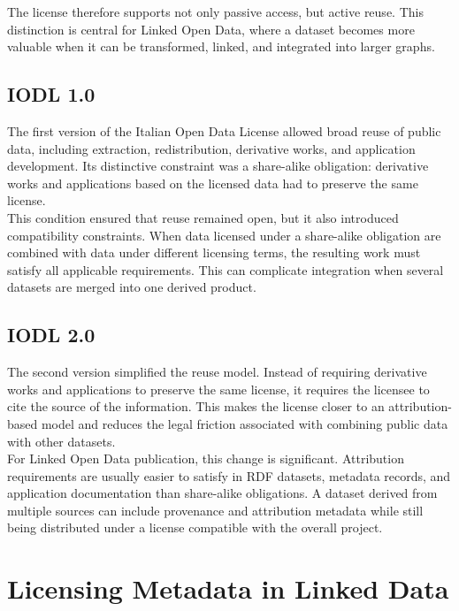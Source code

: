 \documentclass{scrbook}
\begin{document}
	The license therefore supports not only passive access, but active reuse. This distinction is central for Linked Open Data, where a dataset becomes more valuable when it can be transformed, linked, and integrated into larger graphs.
	
	\subsection{IODL 1.0}
	
	The first version of the Italian Open Data License allowed broad reuse of public data, including extraction, redistribution, derivative works, and application development. Its distinctive constraint was a share-alike obligation: derivative works and applications based on the licensed data had to preserve the same license.\\
	
	This condition ensured that reuse remained open, but it also introduced compatibility constraints. When data licensed under a share-alike obligation are combined with data under different licensing terms, the resulting work must satisfy all applicable requirements. This can complicate integration when several datasets are merged into one derived product.
	
	\subsection{IODL 2.0}
	
	The second version simplified the reuse model. Instead of requiring derivative works and applications to preserve the same license, it requires the licensee to cite the source of the information. This makes the license closer to an attribution-based model and reduces the legal friction associated with combining public data with other datasets.\\
	
	For Linked Open Data publication, this change is significant. Attribution requirements are usually easier to satisfy in RDF datasets, metadata records, and application documentation than share-alike obligations. A dataset derived from multiple sources can include provenance and attribution metadata while still being distributed under a license compatible with the overall project.
	
	\section{Licensing Metadata in Linked Data}
	
\end{document}
